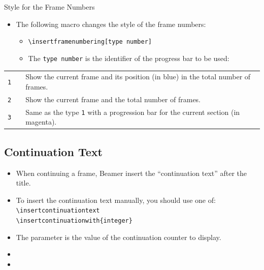 \documentclass[english,sectioncirclenumberstyle]{le2iutbmbeamer}
\begin{document}
\begin{frame}[label=progressbartypes,t]{Style for the Frame Numbers}
	\begin{itemize}
	\item The following macro changes the style of the frame numbers:
		\begin{itemize}
		\item \texttt{{\textbackslash}insertframenumbering[type number]}
		\item The \texttt{type number} is the identifier of the progress bar to be used:
		\end{itemize}
	\end{itemize}
	\begin{tabularx}{\linewidth}{|c|c|X|}
	\hline
	\tabularheading\chead{Type number} & \chead{Output} & \chead{Explanation} \\
	\hline
	\texttt{1} & \insertframenumbering[1] & Show the current frame and its position (in blue) in the total number of frames. \\
	\hline
	\texttt{2} & \colorbox{LE2IUTBMdarkgray}{\tiny\insertframenumbering[2]} & Show the current frame and the total number of frames. \\
	\hline
	\texttt{3} & \insertframenumbering[3] & Same as the type \texttt{1} with a progression bar for the current section (in magenta). \\
	\hline
	\end{tabularx}
\end{frame}

\subsection{Continuation Text}
\begin{frame}{\subsecname}
	\begin{itemize}
	\item When continuing a frame, Beamer insert the ``continuation text'' after the title.
	\vfill
	\item To insert the continuation text manually, you should use one of:
		\texttt{{\textbackslash}insertcontinuationtext} \\
		\texttt{{\textbackslash}insertcontinuationwith\{integer\}}
	\item The parameter is the value of the continuation counter to display.
	\vfill
	\item {}
	\item {}
	\end{itemize}
\end{frame}
\end{document}
